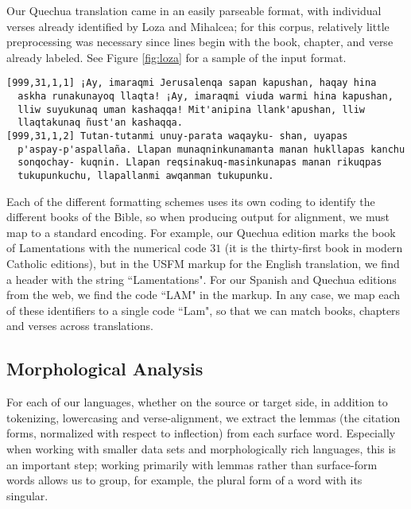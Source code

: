 Our Quechua translation came in an easily parseable format, with individual
verses already identified by Loza and Mihalcea; for this corpus, relatively
little preprocessing was necessary since lines begin with the book, chapter,
and verse already labeled. See Figure \ref{fig:loza} for a sample of the input
format.

\begin{figure*}
\raggedright \begin{verbatim}
[999,31,1,1] ¡Ay, imaraqmi Jerusalenqa sapan kapushan, haqay hina
  askha runakunayoq llaqta! ¡Ay, imaraqmi viuda warmi hina kapushan,
  lliw suyukunaq uman kashaqqa! Mit'anipina llank'apushan, lliw
  llaqtakunaq ñust'an kashaqqa.
[999,31,1,2] Tutan-tutanmi unuy-parata waqayku- shan, uyapas
  p'aspay-p'aspallaña. Llapan munaqninkunamanta manan hukllapas kanchu
  sonqochay- kuqnin. Llapan reqsinakuq-masinkunapas manan rikuqpas
  tukupunkuchu, llapallanmi awqanman tukupunku.
\end{verbatim}
  \caption{The first two verses of the Book of Lamentations in Quechua, from
  the 2004 Peruvian Bible Society translation. Whitespace changes added here
  for readability.}
  \label{fig:loza}
\end{figure*}

Each of the different formatting schemes uses its own coding to identify the
different books of the Bible, so when producing output for alignment, we must
map to a standard encoding. For example, our Quechua edition marks the book of
Lamentations with the numerical code $31$ (it is the thirty-first book in
modern Catholic editions), but in the USFM markup for the English translation,
we find a header with the string ``Lamentations". For our Spanish and Quechua
editions from the web, we find the code ``LAM" in the markup. In any case, we
map each of these identifiers to a single code ``Lam", so that we can match
books, chapters and verses across translations.

\subsection{Morphological Analysis}
\label{sec:guaranima}

For each of our languages, whether on the source or target side, in addition to
tokenizing, lowercasing and verse-alignment, we extract the lemmas (the
citation forms, normalized with respect to inflection) from each surface word.
Especially when working with smaller data sets and morphologically rich
languages, this is an important step; working primarily with lemmas rather than
surface-form words allows us to group, for example, the plural form of a word
with its singular.

